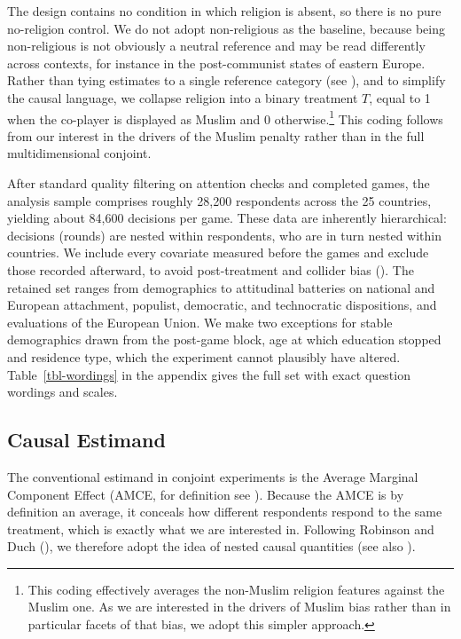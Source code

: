 \documentclass[
  10pt,
  a4paper,
  DIV=11,
  numbers=noendperiod]{scrartcl}
\begin{document}
The design contains no condition in which religion is absent, so there
is no pure no-religion control. We do not adopt non-religious as the
baseline, because being non-religious is not obviously a neutral
reference and may be read differently across contexts, for instance in
the post-communist states of eastern Europe. Rather than tying estimates
to a single reference category (see
), and to simplify
the causal language, we collapse religion into a binary treatment \(T\),
equal to 1 when the co-player is displayed as Muslim and 0
otherwise.\footnote{This coding effectively averages the non-Muslim
  religion features against the Muslim one. As we are interested in the
  drivers of Muslim bias rather than in particular facets of that bias,
  we adopt this simpler approach.} This coding follows from our interest
in the drivers of the Muslim penalty rather than in the full
multidimensional conjoint.

After standard quality filtering on attention checks and completed
games, the analysis sample comprises roughly 28,200 respondents across
the 25 countries, yielding about 84,600 decisions per game. These data
are inherently hierarchical: decisions (rounds) are nested within
respondents, who are in turn nested within countries. We include every
covariate measured before the games and exclude those recorded
afterward, to avoid post-treatment and collider bias
(). The
retained set ranges from demographics to attitudinal batteries on
national and European attachment, populist, democratic, and technocratic
dispositions, and evaluations of the European Union. We make two
exceptions for stable demographics drawn from the post-game block, age
at which education stopped and residence type, which the experiment
cannot plausibly have altered. Table~\ref{tbl-wordings} in the appendix
gives the full set with exact question wordings and scales.

\subsection{Causal Estimand}\label{causal-estimand}

The conventional estimand in conjoint experiments is the Average
Marginal Component Effect (AMCE, for definition see
). Because
the AMCE is by definition an average, it conceals how different
respondents respond to the same treatment, which is exactly what we are
interested in. Following Robinson and Duch
(), we therefore adopt the idea
of nested causal quantities (see also
).
\end{document}
